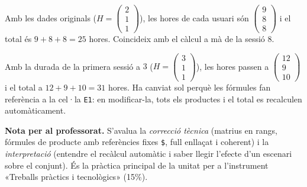 \begin{solucions}
\begin{sollist}
  \item Amb les dades originals ($H=\begin{pmatrix} 2 \\ 1 \\ 1 \end{pmatrix}$), les
        hores de cada usuari són $\begin{pmatrix} 9 \\ 8 \\ 8 \end{pmatrix}$ i el
        total és $9+8+8=25$ hores. Coincideix amb el càlcul a mà de la sessió 8.
  \item Amb la durada de la primera sessió a $3$ ($H=\begin{pmatrix} 3 \\ 1 \\ 1 \end{pmatrix}$),
        les hores passen a $\begin{pmatrix} 12 \\ 9 \\ 10 \end{pmatrix}$ i el total
        a $12+9+10=31$ hores. Ha canviat sol perquè les fórmules fan referència a
        la cel·la \texttt{E1}: en modificar-la, tots els productes i el total es
        recalculen automàticament.
\end{sollist}

\noindent\textbf{Nota per al professorat.} S'avalua la \emph{correcció tècnica}
(matrius en rangs, fórmules de producte amb referències fixes \texttt{\$}, full
enllaçat i coherent) i la \emph{interpretació} (entendre el recàlcul automàtic i
saber llegir l'efecte d'un escenari sobre el conjunt). És la pràctica principal de
la unitat per a l'instrument «Treballs pràctics i tecnològics» (15\%).
\end{solucions}

